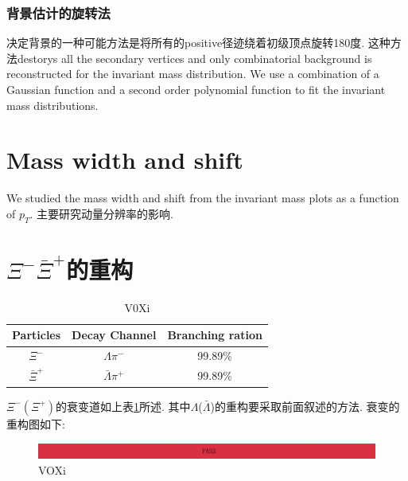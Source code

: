 \subsubsection{背景估计的旋转法}
决定背景的一种可能方法是将所有的positive径迹绕着初级顶点旋转180度.
这种方法destorys all the secondary vertices and only combinatorial background is reconstructed for the invariant mass distribution.
We use a combination of a Gaussian function and a second order polynomial function to fit the invariant mass distributions.

\section{Mass width and shift}
 We studied the mass width and shift from the invariant mass plots as a function of $p_{T}$.
主要研究动量分辨率的影响.

\section{$\Xi^{-}\bar{\Xi}^{+}$的重构}
\begin{table}[hbtp]
  \centering
  \begin{tabular}{ccc}\hline\hline
    Particles & Decay Channel & Branching ration \\\hline
    $\Xi^{-}$ & $\Lambda\pi^{-}$ & 99.89\% \\\hline
    $\bar{\Xi}^{+}$ & $\bar{\Lambda}\pi^{+}$ & 99.89\% \\\hline\hline
  \end{tabular}
  \caption{V0Xi}
  \label{tab:V0Xi}
\end{table}
$\Xi^{-}(\Xi^{+})$的衰变道如上表\ref{tab:V0Xi}所述.
其中$\Lambda$($\bar{\Lambda}$)的重构要采取前面叙述的方法.
衰变的重构图如下:
\begin{figure}[hbtp]
  \centering
  \includegraphics[width=\linewidth]{pictures/pass.pdf}
  \caption{VOXi}
  \label{fig:VOXi}
\end{figure}
